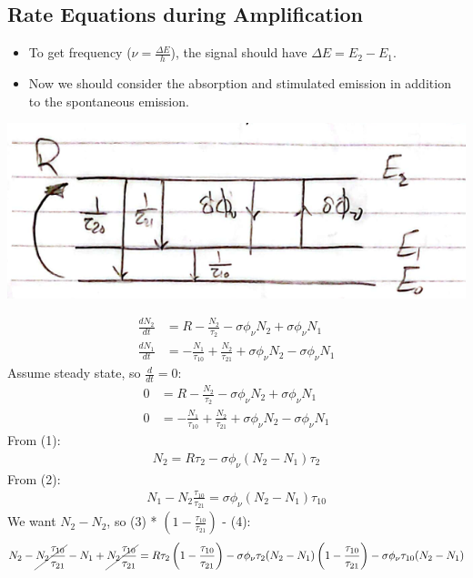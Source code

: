 \documentclass[11pt]{article}
\begin{document}
\subsection{Rate Equations during Amplification}
\begin{itemize}
    \item To get frequency ($\nu = \frac{\Delta E}{h}$), the signal should have $\Delta E = E_2 - E_1$.
    \item Now we should consider the absorption and stimulated emission in addition to the spontaneous emission.
\end{itemize}
\begin{center}
    \includegraphics[scale=1]{3.png}
\end{center}
\begin{align*}
    \frac{dN_2}{dt} &= R - \frac{N_2}{\tau_{2}} - \sigma \phi_{\nu} N_2 + \sigma \phi_{\nu} N_1 \\
    \frac{dN_1}{dt} &= - \frac{N_1}{\tau_{10}} + \frac{N_2}{\tau_{21}} + \sigma \phi_{\nu} N_2 - \sigma \phi_{\nu} N_1 
\end{align*}
Assume steady state, so $\frac{d}{dt} = 0$:
\setcounter{equation}{0}
\begin{align}
    0 &= R - \frac{N_2}{\tau_{2}} - \sigma \phi_{\nu} N_2 + \sigma \phi_{\nu} N_1 \\
    0 &= - \frac{N_1}{\tau_{10}} + \frac{N_2}{\tau_{21}} + \sigma \phi_{\nu} N_2 - \sigma \phi_{\nu} N_1
\end{align}
From (1):
\begin{align}
    N_2 = R \tau_2 - \sigma \phi_{\nu}(N_2 - N_1) \tau_2
\end{align}
From (2):
\begin{align}
    N_1 - N_2 \frac{\tau_{10}}{\tau_{21}} = \sigma \phi_{\nu}(N_2 - N_1) \tau_{10}
\end{align}
We want $N_2 - N_2$, so (3) * $\left( 1- \frac{\tau_{10}}{\tau_{21}} \right)$ - (4):
\begin{align*}
    N_2 - \cancel{N_2 \frac{\tau_{10}}{\tau_{21}}} - N_1 + \cancel{N_2 \frac{\tau_{10}}{\tau_{21}}} = R \tau_2 \left( 1- \frac{\tau_{10}}{\tau_{21}} \right) - \sigma \phi_{\nu}\tau_2(N_2 - N_1) \left( 1- \frac{\tau_{10}}{\tau_{21}} \right) - \sigma \phi_{\nu} \tau_{10} (N_2 - N_1)
\end{align*}
\end{document}
